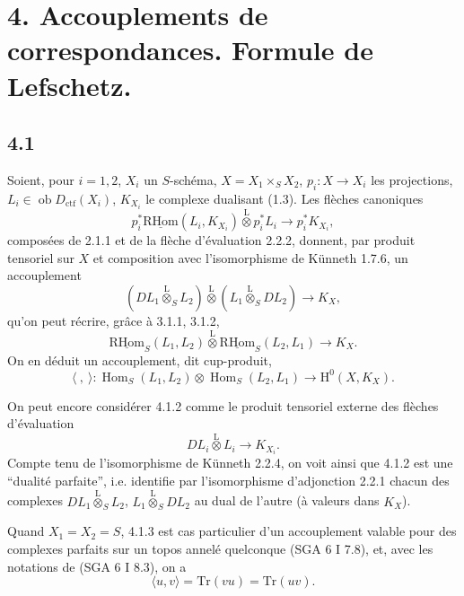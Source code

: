 \documentclass[11pt]{article}
\renewcommand{\H}{\mathrm{H}}
\DeclareMathOperator{\Hom}{Hom}
\newcommand{\R}{\mathrm{R}}\newcommand{\RHomCore}{\mathrm{RHom}}
\newcommand{\ob}{\operatorname{ob}}
\providecommand{\RHom}{\RHomCore}
\providecommand{\uRHom}{\underline{\RHom}}
\providecommand{\Dctf}{D_{\mathrm{ctf}}}
\providecommand{\Dctf}{D_{\mathrm{ctf}}}
\providecommand{\RHom}{\RHomCore}
\providecommand{\Hom}{\operatorname{Hom}}
\providecommand{\ob}{\operatorname{ob}}
\providecommand{\RHom}{\R\mathcal{H}om}
\providecommand{\R}{\mathrm R}
\providecommand{\RHom}{\RHomCore}
\providecommand{\Hom}{\operatorname{Hom}}
\begin{document}
\section*{4. Accouplements de correspondances. Formule de Lefschetz.}

\subsection*{4.1}
Soient, pour $i=1,2$, $X_i$ un $S$-schéma, $X=X_1\times_SX_2$, $p_i:X\to X_i$ les projections, $L_i\in\ob\Dctf(X_i)$, $K_{X_i}$ le complexe dualisant (1.3). Les flèches canoniques
\begin{equation}
p_i^*\uRHom(L_i,K_{X_i})\overset{\mathrm{L}}{\otimes}p_i^*L_i
\longrightarrow p_i^*K_{X_i},
\tag{4.1.1}
\end{equation}
composées de 2.1.1 et de la flèche d'évaluation 2.2.2, donnent, par produit tensoriel sur $X$ et composition avec l'isomorphisme de Künneth 1.7.6, un accouplement
\begin{equation}
(DL_1\overset{\mathrm{L}}{\otimes}_S L_2)\overset{\mathrm{L}}{\otimes}(L_1\overset{\mathrm{L}}{\otimes}_S DL_2)
\longrightarrow K_X,
\tag{4.1.2}
\end{equation}
qu'on peut récrire, grâce à 3.1.1, 3.1.2,
\begin{equation}
\uRHom_S(L_1,L_2)\overset{\mathrm{L}}{\otimes}\uRHom_S(L_2,L_1)
\longrightarrow K_X.
\tag{4.1.3}
\end{equation}
On en déduit un accouplement, dit cup-produit,
\begin{equation}
\langle\ ,\ \rangle:\Hom_S(L_1,L_2)\otimes\Hom_S(L_2,L_1)
\longrightarrow \H^0(X,K_X).
\tag{4.1.4}
\end{equation}

On peut encore considérer 4.1.2 comme le produit tensoriel externe des flèches d'évaluation
\[
DL_i\overset{\mathrm{L}}{\otimes}L_i\longrightarrow K_{X_i}.
\]
Compte tenu de l'isomorphisme de Künneth 2.2.4, on voit ainsi que 4.1.2 est une ``dualité parfaite'', i.e. identifie par l'isomorphisme d'adjonction 2.2.1 chacun des complexes $DL_1\overset{\mathrm{L}}{\otimes}_S L_2$, $L_1\overset{\mathrm{L}}{\otimes}_S DL_2$ au dual de l'autre (à valeurs dans $K_X$).

Quand $X_1=X_2=S$, 4.1.3 est cas particulier d'un accouplement valable pour des complexes parfaits sur un topos annelé quelconque (SGA 6 I 7.8), et, avec les notations de (SGA 6 I 8.3), on a
\begin{equation}
\langle u,v\rangle=\mathrm{Tr}(vu)=\mathrm{Tr}(uv).
\tag{4.1.5}
\end{equation}
\end{document}
